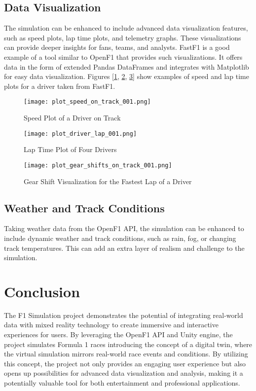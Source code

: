 \documentclass[
	a4paper, %
	10pt, %
	unnumberedsections, %
	twoside, %
]{LTJournalArticle}
\begin{document}
\subsection{Data Visualization}
The simulation can be enhanced to include advanced data visualization features, such as speed plots, lap time plots, and telemetry graphs. These visualizations can provide deeper insights for fans, teams, and analysts. FastF1 \autocite{fastF1} is a good example of a tool similar to OpenF1 that provides such visualizations. It offers data in the form of extended Pandas DataFrames and integrates with Matplotlib for easy data visualization. Figures [\ref{fig:speed_plot}, \ref{fig:lap_time_plot}, \ref{fig:gear_shifts_plot}] show examples of speed and lap time plots for a driver taken from FastF1.

\begin{figure}[h]
	\texttt{[image: plot\_speed\_on\_track\_001.png]}
	\caption{Speed Plot of a Driver on Track}
    \label{fig:speed_plot}
\end{figure}

\begin{figure}[h]
    \texttt{[image: plot\_driver\_lap\_001.png]}
    \caption{Lap Time Plot of Four Drivers}
    \label{fig:lap_time_plot}
\end{figure}

\begin{figure}[h]
    \texttt{[image: plot\_gear\_shifts\_on\_track\_001.png]}
    \caption{Gear Shift Visualization for the Fastest Lap of a Driver}
    \label{fig:gear_shifts_plot}
\end{figure}

\subsection{Weather and Track Conditions}
Taking weather data from the OpenF1 API, the simulation can be enhanced to include dynamic weather and track conditions, such as rain, fog, or changing track temperatures. This can add an extra layer of realism and challenge to the simulation.

\section{Conclusion}
The F1 Simulation project demonstrates the potential of integrating real-world data with mixed reality technology to create immersive and interactive experiences for users. By leveraging the OpenF1 API and Unity engine, the project simulates Formula 1 races introducing the concept of a digital twin, where the virtual simulation mirrors real-world race events and conditions. By utilizing this concept, the project not only provides an engaging user experience but also opens up possibilities for advanced data visualization and analysis, making it a potentially valuable tool for both entertainment and professional applications.

\printbibliography
\end{document}
